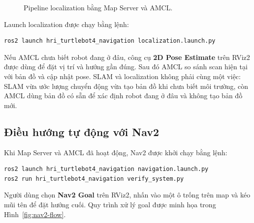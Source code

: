 \documentclass[12pt,a4paper]{article}
\begin{document}
\begin{figure}[htbp]
  \centering
  \caption{Pipeline localization bằng Map Server và AMCL.}
  \label{fig:localization-flow}
\end{figure}

Launch localization được chạy bằng lệnh:

\begin{verbatim}
ros2 launch hri_turtlebot4_navigation localization.launch.py
\end{verbatim}

Nếu AMCL chưa biết robot đang ở đâu, công cụ \textbf{2D Pose Estimate} trên
RViz2 được dùng để đặt vị trí và hướng gần đúng. Sau đó AMCL so sánh scan hiện
tại với bản đồ và cập nhật pose. SLAM và localization không phải cùng một việc:
SLAM vừa ước lượng chuyển động vừa tạo bản đồ khi chưa biết môi trường, còn AMCL
dùng bản đồ có sẵn để xác định robot đang ở đâu và không tạo bản đồ mới.

\subsection{Điều hướng tự động với Nav2}

Khi Map Server và AMCL đã hoạt động, Nav2 được khởi chạy bằng lệnh:

\begin{verbatim}
ros2 launch hri_turtlebot4_navigation navigation.launch.py
ros2 run hri_turtlebot4_navigation verify_system.py
\end{verbatim}

Người dùng chọn \textbf{Nav2 Goal} trên RViz2, nhấn vào một ô trống trên map và
kéo mũi tên để đặt hướng cuối. Quy trình xử lý goal được minh họa trong
Hình~\ref{fig:nav2-flow}.
\end{document}
